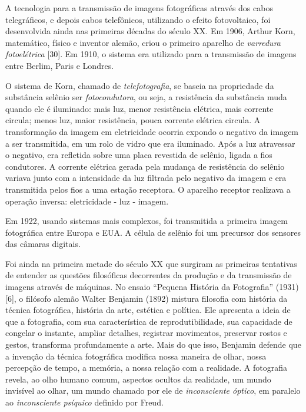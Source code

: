 \documentclass{hipatia}
\begin{document}
A tecnologia para a transmissão de imagens fotográficas através dos cabos telegráficos, e depois cabos telefônicos, utilizando o efeito fotovoltaico, foi desenvolvida ainda nas primeiras décadas do século XX. Em 1906, Arthur Korn, matemático, físico e inventor alemão, criou o primeiro aparelho de \textit{varredura fotoelétrica} [30]. Em 1910, o sistema era utilizado para a transmissão de imagens entre Berlim, Paris e Londres. 

O sistema de Korn, chamado de \textit{telefotografia}, se baseia na propriedade da substância selênio ser \textit{fotocondutora}, ou seja, a resistência da substância muda quando ele é iluminado: mais luz, menor resistência elétrica, mais corrente circula; menos luz, maior resistência, pouca corrente elétrica circula. A transformação da imagem em eletricidade ocorria expondo o negativo da imagem a ser transmitida, em um rolo de vidro que era iluminado. Após a luz atravessar o negativo, era refletida sobre uma placa revestida de selênio, ligada a fios condutores. A corrente elétrica gerada pela mudança de resistência do selênio variava junto com a intensidade da luz filtrada pelo negativo da imagem e era transmitida pelos fios a uma estação receptora. O aparelho receptor realizava a operação inversa: eletricidade - luz - imagem. 

Em 1922, usando sistemas mais complexos, foi transmitida a primeira imagem fotográfica entre Europa e EUA. A célula de selênio foi um precursor dos sensores das câmaras digitais. 

Foi ainda na primeira metade do século XX que surgiram as primeiras tentativas de entender as questões filosóficas decorrentes da produção e da transmissão de imagens através de máquinas. No ensaio ``Pequena História da Fotografia'' (1931) [6], o filósofo alemão Walter Benjamin (1892) mistura filosofia com história da técnica fotográfica, história da arte, estética e política. Ele apresenta a ideia de que a fotografia, com sua característica de reprodutibilidade, sua capacidade de congelar o instante, ampliar detalhes, registrar movimentos, preservar rostos e gestos, transforma profundamente a arte. Mais do que isso, Benjamin defende que a invenção da técnica fotográfica modifica nossa maneira de olhar, nossa percepção de tempo, a memória, a nossa relação com a realidade. A fotografia revela, ao olho humano comum, aspectos ocultos da realidade, um mundo invisível ao olhar, um mundo chamado por ele de \textit{inconsciente óptico}, em paralelo ao \textit{inconsciente psíquico} definido por Freud.
\end{document}
